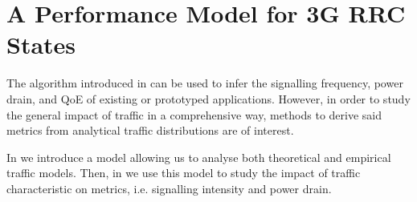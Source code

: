 \section{A Performance Model for 3G RRC States}\label{sec:network:performance_model}
The algorithm introduced in  can be used to infer the signalling frequency, power drain, and \gls{QoE} of existing or prototyped applications.
However, in order to study the general impact of traffic in a comprehensive way, methods to derive said metrics from analytical traffic distributions are of interest.

In  we introduce a model allowing us to
analyse both theoretical and empirical traffic models.
Then, in  we use this model to study the impact of traffic characteristic on metrics, i.e. signalling intensity and power drain.

%
%
